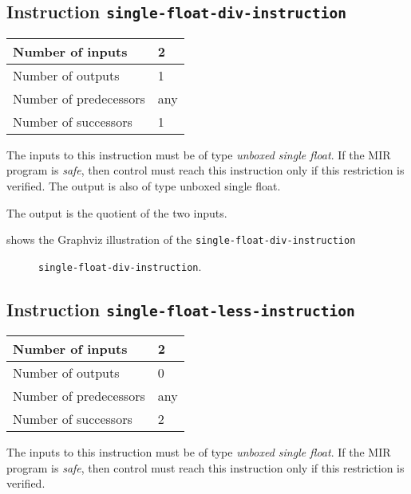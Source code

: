 \subsection{Instruction \texttt{single-float-div-instruction}}
\label{mir-instruction-single-float-div}

\begin{tabular}{|l|l|}
\hline
Number of inputs & 2\\
\hline
Number of outputs & 1\\
\hline
Number of predecessors & any\\
\hline
Number of successors & 1\\
\hline
\end{tabular}

The inputs to this instruction must be of type \emph{unboxed single
  float}.  If the MIR program is \emph{safe}, then control must reach
this instruction only if this restriction is verified.  The output is
also of type unboxed single float.

The output is the quotient of the two inputs.

 shows the Graphviz illustration of the
\texttt{single-float-div-instruction}

\begin{figure}
\begin{center}
\end{center}
\caption{\label{fig-single-float-div-instruction}
\texttt{single-float-div-instruction}.}
\end{figure}

\subsection{Instruction \texttt{single-float-less-instruction}}
\label{mir-instruction-single-float-less}

\begin{tabular}{|l|l|}
\hline
Number of inputs & 2\\
\hline
Number of outputs & 0\\
\hline
Number of predecessors & any\\
\hline
Number of successors & 2\\
\hline
\end{tabular}

The inputs to this instruction must be of type \emph{unboxed single
  float}.  If the MIR program is \emph{safe}, then control must reach
this instruction only if this restriction is verified.

